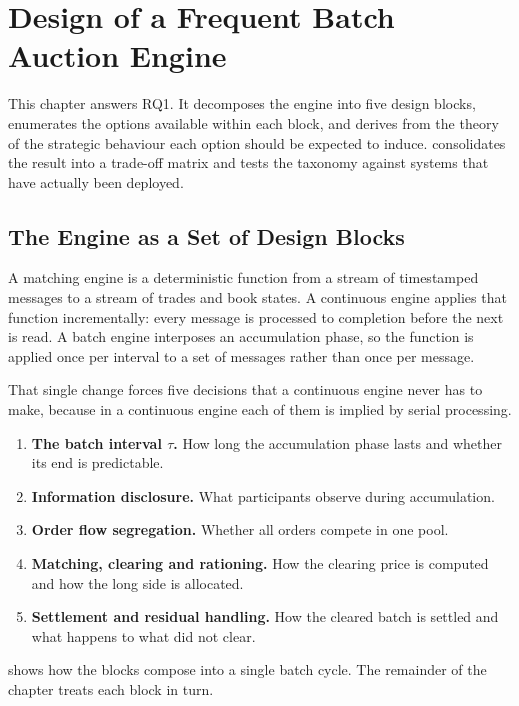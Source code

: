 \chapter{Design of a Frequent Batch Auction Engine}
\label{ch:design}

This chapter answers RQ1. It decomposes the engine into five design
blocks, enumerates the options available within each block, and derives
from the theory of  the strategic behaviour each
option should be expected to induce.  consolidates
the result into a trade-off matrix and  tests the
taxonomy against systems that have actually been deployed.

\section{The Engine as a Set of Design Blocks}
\label{sec:blocks}

A matching engine is a deterministic function from a stream of
timestamped messages to a stream of trades and book states. A continuous
engine applies that function incrementally: every message is processed
to completion before the next is read. A batch engine interposes an
accumulation phase, so the function is applied once per interval to a
set of messages rather than once per message.

That single change forces five decisions that a continuous engine never
has to make, because in a continuous engine each of them is implied by
serial processing.

\begin{enumerate}
  \item \textbf{The batch interval $\tau$.} How long the accumulation
  phase lasts and whether its end is predictable.
  \item \textbf{Information disclosure.} What participants observe
  during accumulation.
  \item \textbf{Order flow segregation.} Whether all orders compete in
  one pool.
  \item \textbf{Matching, clearing and rationing.} How the clearing
  price is computed and how the long side is allocated.
  \item \textbf{Settlement and residual handling.} How the cleared batch
  is settled and what happens to what did not clear.
\end{enumerate}

 shows how the blocks compose into a single batch
cycle. The remainder of the chapter treats each block in turn.

